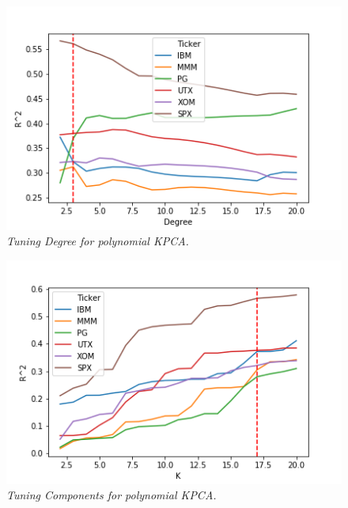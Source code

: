 \documentclass[a4paper]{article}
\begin{document}
    \begin{figure}[t]
    	\centering
    	\includegraphics[width=\linewidth]{poly_degree_tune.png}
    	\caption{{\it Tuning Degree for polynomial KPCA.}}
    	\label{fig:PolyDegreeTuning}
    \end{figure}
   
   \begin{figure}[t]
   	\centering
   	\includegraphics[width=\linewidth]{poly_components_tune.png}
   	\caption{{\it Tuning Components for polynomial KPCA.}}
   	\label{fig:PolyComponentTuning}
   \end{figure}
   
\end{document}
